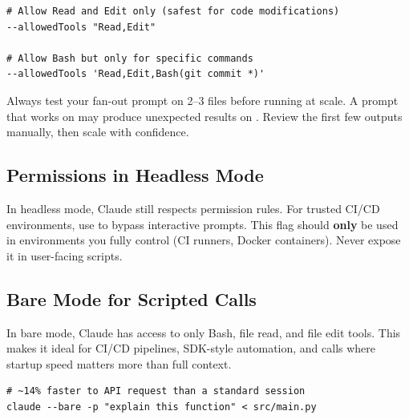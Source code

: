 \begin{verbatim}
# Allow Read and Edit only (safest for code modifications)
--allowedTools "Read,Edit"

# Allow Bash but only for specific commands
--allowedTools 'Read,Edit,Bash(git commit *)'
\end{verbatim}

\begin{warnbox}
Always test your fan-out prompt on 2--3 files before running at scale.
A prompt that works on  may produce unexpected results
on . Review the first few outputs manually,
then scale with confidence.
\end{warnbox}


\subsection{Permissions in Headless Mode}

\begin{warnbox}
In headless mode, Claude still respects permission rules.
For trusted CI/CD environments, use 
to bypass interactive prompts.
This flag should \textbf{only} be used in environments you fully control
(CI runners, Docker containers). Never expose it in user-facing scripts.
\end{warnbox}

\subsection{Bare Mode for Scripted Calls}
\label{subsec:bare-mode}


In bare mode, Claude has access to only Bash, file read, and file edit
tools. This makes it ideal for CI/CD pipelines, SDK-style automation,
and  calls where startup speed matters more than full context.

\begin{verbatim}
# ~14% faster to API request than a standard session
claude --bare -p "explain this function" < src/main.py
\end{verbatim}

